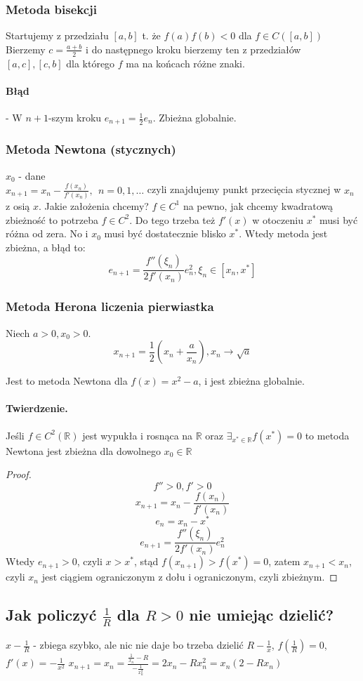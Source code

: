 \documentclass{article}
\begin{document}
\subsubsection{Metoda bisekcji}
Startujemy z przedziału $ [a,b] $ t. że $ f(a)f(b)<0 $ dla $ f\in C([a,b]) $
Bierzemy $ c=\frac{a+b}{2} $ i do następnego kroku bierzemy ten z przedziałów $ [a,c], [c,b] $ dla którego $ f $ ma na końcach różne znaki.
\paragraph{Błąd} -  W $ n+1 $-szym kroku $ e_{n+1}=\frac12 e_n $.
Zbieżna globalnie.
\subsubsection{Metoda Newtona (stycznych)}
$ x_0 $ - dane\\
$ x_{n+1} =x_n-\frac{f(x_n)}{f'(x_n)},\ \ n=0,1,\dots$
czyli znajdujemy punkt przecięcia stycznej w $ x_n $ z osią $ x $. 
Jakie założenia chcemy? $ f\in C^1 $ na pewno, jak chcemy kwadratową zbieżność to potrzeba $ f\in C^2 $. Do tego trzeba też $ f'(x) $ w otoczeniu $ x^* $ musi być różna od zera. No i $ x_0 $ musi być dostatecznie blisko $ x^* $. Wtedy metoda jest zbieżna, a błąd to: 
$$ e_{n+1}=\frac{f''(\xi_n)}{2f'(x_n)}e_n^2, \xi_n \in [x_n, x^*] $$
\subsubsection{Metoda Herona liczenia pierwiastka}
Niech $ a>0, x_0>0 $. 
$$ x_{n+1}=\frac12(x_n+\frac a{x_n}), x_n \rightarrow \sqrt a $$

Jest to metoda Newtona dla $ f(x)=x^2-a $, i jest zbieżna globalnie.
\paragraph{Twierdzenie.} Jeśli $ f \in C^2(\mathbb{R}) $ jest wypukła i rosnąca na $ \mathbb{R} $ oraz $ \exists_{x^*\in\mathbb{R}}f(x^*)=0 $ to metoda Newtona jest zbieżna dla dowolnego $ x_0\in\mathbb{R} $
\begin{proof}
	$$ f''>0, f'>0 $$
	$$x_{n+1}=x_n-\frac{f(x_n)}{f'(x_n)}$$
	$$e_n=x_n-x^*$$
	$$e_{n+1}=\frac{f''(\xi_n)}{2f'(x_n)}e_n^2$$
	Wtedy $ e_{n+1}>0 $, czyli $ x>x^* $, stąd $ f(x_{n+1})>f(x^*)=0 $, zatem $ x_{n+1}<x_n $, czyli $ x_n $ jest ciągiem ograniczonym z dołu i ograniczonym, czyli zbieżnym.
\end{proof}
\subsection{Jak policzyć $\frac{1}{R}$ dla $ R>0 $ nie umiejąc dzielić?}
$ x-\frac1R $ - zbiega szybko, ale nic nie daje bo trzeba dzielić
$ R-\frac1x $, $ f(\frac1R)=0 $, $ f'(x)=-\frac1{x^2} $
$ x_{n+1} = x_n=\frac{\frac{1}{x_n}-R}{-\frac{1}{x^2_n}}=2x_n-Rx_n^2=x_n(2-Rx_n)$
\end{document}

